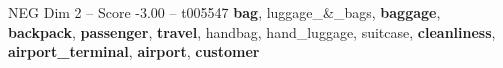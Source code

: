 \begin{textsample}{NEG Dim 2 – Score -3.00 – t005547}  \label{ex:f2_neg_033}
\textbf{bag}, luggage\_\&\_bags, \textbf{baggage}, \textbf{backpack}, \textbf{passenger}, \textbf{travel}, handbag, hand\_luggage, suitcase, \textbf{cleanliness}, \textbf{airport\_terminal}, \textbf{airport}, \textbf{customer}

\end{textsample}
